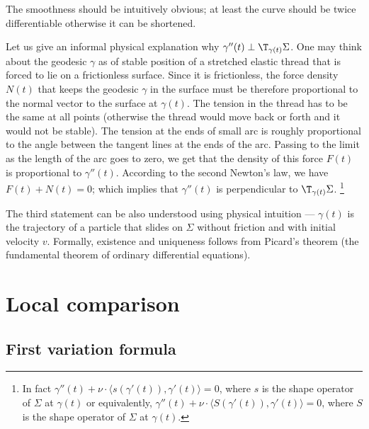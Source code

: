 The smoothness should be intuitively obvious; at least the curve should be twice differentiable otherwise it can be shortened.

Let us give an informal physical explanation why $\gamma''(t)\perp\T_{\gamma(t)}\Sigma$.
One may think about the geodesic $\gamma$ as of stable position of a stretched elastic thread that is forced to lie on a frictionless surface.
Since it is frictionless, the force density $N(t)$ that keeps the geodesic $\gamma$ in the surface must be therefore proportional to the normal vector to the surface at $\gamma(t)$.
The tension in the thread has to be the same at all points (otherwise the thread would move back or forth and it would not be stable).
The tension at the ends of small arc is roughly proportional to the angle between the tangent lines at the ends of the arc. 
Passing to the limit as the length of the arc goes to zero, we get that the density of this force $F(t)$ is proportional to $\gamma''(t)$.
According to the second Newton's law, we have $F(t)+N(t)=0$;
which implies that  $\gamma''(t)$ is perpendicular to $\T_{\gamma(t)}\Sigma$.%
\footnote{In fact $\gamma''(t)+\nu\cdot \langle s(\gamma'(t)),\gamma'(t)\rangle=0$, where $s$ is the shape operator of $\Sigma$ at $\gamma(t)$ or equivalently,
$\gamma''(t)+\nu\cdot  \langle S(\gamma'(t)),\gamma'(t)\rangle=0$, where $S$ is the shape operator of $\Sigma$ at $\gamma(t)$.}

The third statement can be also understood using physical intuition --- $\gamma(t)$ is the trajectory of a particle that slides on $\Sigma$ without friction and with initial velocity $v$.
Formally, existence and uniqueness follows from Picard's theorem (the  fundamental theorem of ordinary differential equations).
\qeds




























\chapter{Local comparison}

\section{First variation formula}

